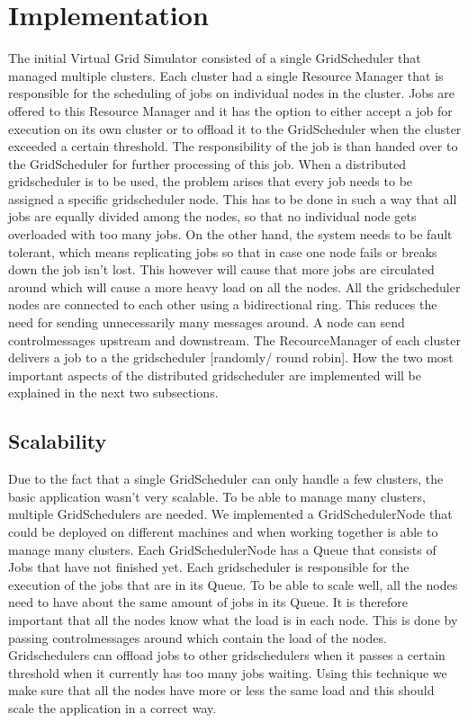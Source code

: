 \documentclass[twocolumn,a4paper]{article}
\begin{document}
\section{Implementation}
The initial Virtual Grid Simulator consisted of a single GridScheduler that managed multiple clusters. Each cluster had a single Resource Manager that is responsible for the scheduling of jobs on individual nodes in the cluster. Jobs are offered to this Resource Manager and it has the option to either accept a job for execution on its own cluster or to offload it to the GridScheduler when the cluster exceeded a certain threshold. The responsibility of the job is than handed over to the GridScheduler for further processing of this job.
When a distributed gridscheduler is to be used, the problem arises that every job needs to be assigned a specific gridscheduler node. This has to be done in such a way that all jobs are equally divided among the nodes, so that no individual node gets overloaded with too many jobs. On the other hand, the system needs to be fault tolerant, which means replicating jobs so that in case one node fails or breaks down the job isn't lost. This however will cause that more jobs are circulated around which will cause a more heavy load on all the nodes.
All the gridscheduler nodes are connected to each other using a bidirectional ring. This reduces the need for sending unnecessarily many messages around. A node can send controlmessages upstream and downstream. The RecourceManager of each cluster delivers a job to a the gridscheduler [randomly/ round robin]. How the two most important aspects of the distributed gridscheduler are implemented will be explained in the next two subsections.

\subsection{Scalability}
Due to the fact that a single GridScheduler can only handle a few clusters, the basic application wasn't very scalable. To be able to manage many clusters, multiple GridSchedulers are needed. We implemented a  GridSchedulerNode that could be deployed on different machines and when working together is able to manage many clusters. Each GridSchedulerNode has a Queue that consists of Jobs that have not finished yet. Each gridscheduler is responsible for the execution of the jobs that are in its Queue. To be able to scale well, all the nodes need to have about the same amount of jobs in its Queue. It is therefore important that all the nodes know what the load is in each node. This is done by passing controlmessages around which contain the load of the nodes. Gridschedulers can offload jobs to other gridschedulers when it passes a certain threshold when it currently has too many jobs waiting.
Using this technique we make sure that all the nodes have more or less the same load and this should scale the application in a correct way.
\end{document}
